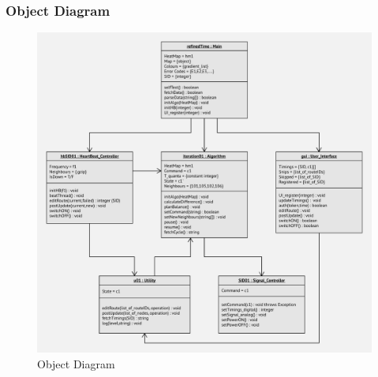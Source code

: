 \documentclass[12pt,a4paper,final]{report}
\begin{document}
\subsubsection{Object Diagram}
	\begin{figure}[!h]
		\begin{center}
			\includegraphics[scale=0.6]{Diagrams/Old Diagrams/Object_Diagram.jpeg}
		\end{center}
		\caption{Object Diagram}
	\end{figure}
\newpage
\end{document}

